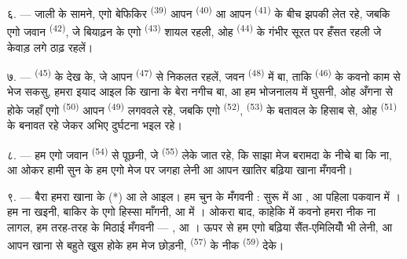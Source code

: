 \VUsaut{4.0mm}
\VUsaut{3.0mm}

६. --- जाली के सामने, एगो बेफिकिर 
\textsuperscript{(39)} आपन  \textsuperscript{(40)} आ आपन
 \textsuperscript{(41)} के बीच झपकी लेत रहे, जबकि
एगो जवान  \textsuperscript{(42)}, जे बियाढ़न के एगो
 \textsuperscript{(43)} शायल रहली, ओह 
\textsuperscript{(44)} के गंभीर सूरत पर हँसत रहली जे केवाड़ लगे ठाढ़
रहलें।

७. ---  \textsuperscript{(45)} के देख के, जे आपन
 \textsuperscript{(47)} से निकलत रहलें, जवन 
\textsuperscript{(48)} में बा, ताकि 
\textsuperscript{(46)} के कवनो काम से भेज सकसु, हमरा इयाद आइल कि खाना के
बेरा नगीच बा, आ हम भोजनालय में घुसनी, ओह अँगना से होके जहाँ एगो
 \textsuperscript{(50)} आपन  \textsuperscript{(49)}
लगववले रहे, जबकि एगो  \textsuperscript{(52)},
 \textsuperscript{(53)} के बतावल के हिसाब से, ओह
 \textsuperscript{(51)} के बनावत रहे जेकर अभिए
दुर्घटना भइल रहे।

८. --- हम एगो जवान  \textsuperscript{(54)} से पूछनी,
जे  \textsuperscript{(55)} लेके जात रहे, कि साझा मेज
बरामदा के नीचे बा कि ना, आ ओकर हामी सुन के हम एगो मेज पर जगहा लेनी आ
आपन खातिर बढ़िया खाना मँगवनी।


\VUsaut{4.0mm}
\VUsaut{3.0mm}

९. --- बैरा हमरा खाना के  (*) आ  ले
आइल। हम चुन के मँगवनी : सुरू में  आ , आ
पहिला पकवान में । हम  ना
खइनी, बाकिर  के एगो हिस्सा माँगनी, आ
 में । ओकरा बाद, काहेकि
 में कवनो हमरा नीक ना लागल, हम तरह-तरह के मिठाई
मँगवनी — ,  आ । ऊपर से हम एगो
बढ़िया सैंत-एमिलियोँ  भी लेनी, आ आपन खाना से बहुते खुस
होके हम मेज छोड़नी,  \textsuperscript{(57)} के नीक
 \textsuperscript{(59)} देके।

